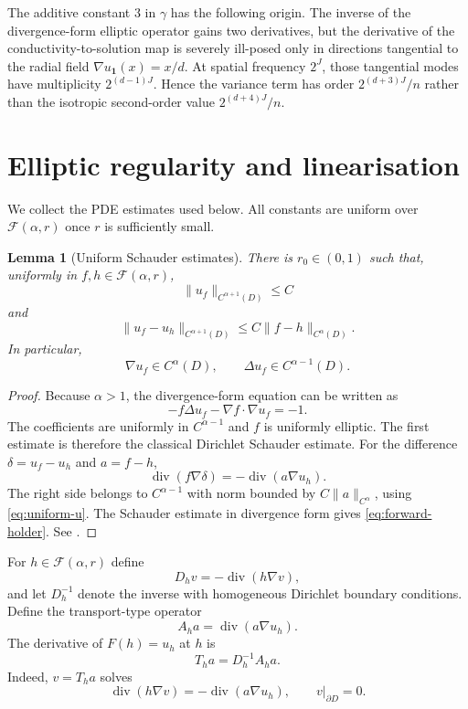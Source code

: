 \documentclass[11pt,a4paper]{article}
\newtheorem{lemma}[theorem]{Lemma}
\theoremstyle{remark}
\numberwithin{equation}{section}
\newcommand{\bone}{\mathbf 1}
\newcommand{\Div}{\operatorname{div}}
\newcommand{\Fcal}{\mathcal F}
\begin{document}
The additive constant $3$ in $\gamma$ has the following origin. The inverse
of the divergence-form elliptic operator gains two derivatives, but the
derivative of the conductivity-to-solution map is severely ill-posed only in
directions tangential to the radial field $\nabla u_{\bone}(x)=x/d$. At
spatial frequency $2^J$, those tangential modes have multiplicity
$2^{(d-1)J}$. Hence the variance term has order
$2^{(d+3)J}/n$ rather than the isotropic second-order value
$2^{(d+4)J}/n$.

\section{Elliptic regularity and linearisation}

We collect the PDE estimates used below. All constants are uniform over
$\Fcal(\alpha,r)$ once $r$ is sufficiently small.

\begin{lemma}[Uniform Schauder estimates]\label{lem:Schauder}
There is $r_0\in(0,1)$ such that, uniformly in $f,h\in\Fcal(\alpha,r)$,
\begin{equation}\label{eq:uniform-u}
\|u_f\|_{C^{\alpha+1}(D)}\leq C
\end{equation}
and
\begin{equation}\label{eq:forward-holder}
\|u_f-u_h\|_{C^{\alpha+1}(D)}
\leq
C\|f-h\|_{C^\alpha(D)}.
\end{equation}
In particular,
\[
\nabla u_f\in C^\alpha(D),\qquad
\Delta u_f\in C^{\alpha-1}(D).
\]
\end{lemma}

\begin{proof}
Because $\alpha>1$, the divergence-form equation can be written as
\[
-f\Delta u_f-\nabla f\cdot\nabla u_f=-1.
\]
The coefficients are uniformly in $C^{\alpha-1}$ and $f$ is uniformly
elliptic. The first estimate is therefore the classical Dirichlet Schauder
estimate. For the difference $\delta=u_f-u_h$ and $a=f-h$,
\begin{equation}\label{eq:difference}
\Div(f\nabla\delta)=-\Div(a\nabla u_h).
\end{equation}
The right side belongs to $C^{\alpha-1}$ with norm bounded by
$C\|a\|_{C^\alpha}$, using \eqref{eq:uniform-u}. The Schauder estimate in
divergence form gives \eqref{eq:forward-holder}. See
\cite[Chapters 6 and 8]{GT}.
\end{proof}

For $h\in\Fcal(\alpha,r)$ define
\[
D_h v=-\Div(h\nabla v),
\]
and let $D_h^{-1}$ denote the inverse with homogeneous Dirichlet boundary
conditions. Define the transport-type operator
\[
A_ha=\Div(a\nabla u_h).
\]
The derivative of $F(h)=u_h$ at $h$ is
\begin{equation}\label{eq:derivative}
T_ha=D_h^{-1}A_ha.
\end{equation}
Indeed, $v=T_ha$ solves
\begin{equation}\label{eq:derivative-equation}
\Div(h\nabla v)=-\Div(a\nabla u_h),
\qquad
v|_{\partial D}=0.
\end{equation}
\end{document}
